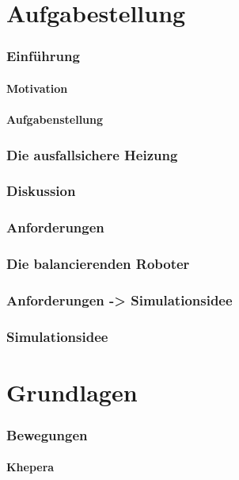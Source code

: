 \documentclass[ngerman]{scrartcl}
\begin{document}
\tableofcontents

\clearpage



\part{Aufgabestellung}
\section{Einf{\"{u}}hrung}
\subsection{Motivation}
\subsection{Aufgabenstellung} 
\section{Die ausfallsichere Heizung}\label{heizung}
\section{Diskussion}
\section{Anforderungen}\label{anforderung}
\section{Die balancierenden Roboter}
\section{Anforderungen -> Simulationsidee}
\section{Simulationsidee}

\part{Grundlagen}
\section{Bewegungen}
\subsection{Khepera}\label{khepera}
\end{document}
